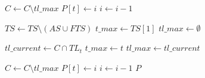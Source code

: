 \begin{algorithm}[htbp!]
\begin{algorithmic}[1]
			\State $C \gets C \setminus tl\_max$
			\State $P[t] \gets i$
			\State $i \gets i - 1$
		\EndWhile
		
		\State $TS \gets TS \setminus (AS \cup FTS)$
			\State $t\_max \gets TS[1]$ 
			\State $tl\_max \gets \emptyset$
			
				\State $tl\_current \gets C \cap TL_{t}$
					\State $t\_max \gets t$
					\State $tl\_max \gets tl\_current$
				\EndIf
			\EndFor
			
			\State $C \gets C \setminus tl\_max$
			\State $P[t] \gets i$
			\State $i \gets i - 1$
		\EndWhile
		\State \Return $P$
	\EndProcedure	
\end{algorithmic}
\end{algorithm}

\clearpage